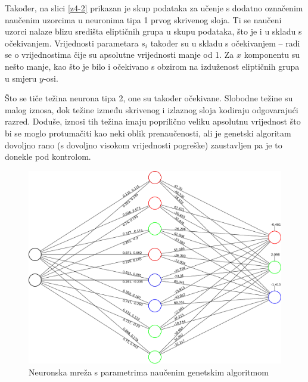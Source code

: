 \documentclass{article}
\begin{document}
Također, na slici \ref{z4-2} prikazan je skup podataka za
učenje s dodatno označenim naučenim uzorcima u neuronima tipa
1 prvog skrivenog sloja. Ti se naučeni uzorci nalaze blizu
središta eliptičnih grupa u skupu podataka, što je i u skladu
s očekivanjem. Vrijednosti parametara $ s_i $ također su u
skladu s očekivanjem -- radi se o vrijednostima čije su
apsolutne vrijednosti manje od 1. Za $ x $ komponentu su
nešto manje, kao što je bilo i očekivano s obzirom na
izduženost eliptičnih grupa u smjeru $ y $-osi.

Što se tiče težina neurona tipa 2, one su također očekivane.
Slobodne težine su malog iznosa, dok težine između skrivenog
i izlaznog sloja kodiraju odgovarajući razred. Doduše, iznosi
tih težina imaju poprilično veliku apsolutnu vrijednost što
bi se moglo protumačiti kao neki oblik prenaučenosti, ali je
genetski algoritam dovoljno rano (s dovoljno visokom
vrijednosti pogreške) zaustavljen pa je to donekle pod
kontrolom.

\begin{figure}
    \centering
    \includegraphics[width=\textwidth]
    {img/task4-neural-network.pdf}
    \caption{Neuronska mreža s parametrima naučenim
    genetskim algoritmom}
    \label{z4-1}
\end{figure}
\end{document}

